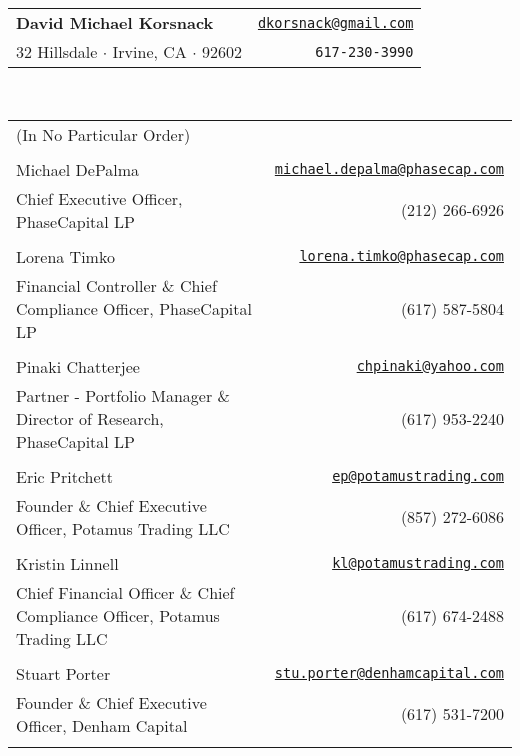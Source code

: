 \documentclass[12]{article}
\newcommand{\head}[1]{
  \colorbox{mygrey}{
    \begin{minipage}{7.35in}
      \center{\textbf{\large #1}}
    \end{minipage}
  }
}
\begin{document}
\begin{tabular*}{7.3in}{@{\extracolsep{\fill}}lr}
  \hspace{-0.25in} \textbf{\LARGE David Michael Korsnack} & \href{mailto:dkorsnack@gmail.com}{\texttt{\large dkorsnack@gmail.com}} \\
  \hspace{-0.25in} {\large 32 Hillsdale $\cdot$ Irvine, CA $\cdot$ 92602} & \texttt{\large 617-230-3990} \\
\end{tabular*} \\
\head{References}
  \begin{tabular*}{7.5in}{@{\extracolsep{\fill}}lr}
    \\
    (In No Particular Order)
    \\ \\
    Michael DePalma & \href{mailto: michael.depalma@phasecap.com}{\texttt{michael.depalma@phasecap.com}} \\
    Chief Executive Officer, PhaseCapital LP & (212) 266-6926 \\
    \\
    Lorena Timko & \href{mailto: lorena.timko@phasecap.com}{\texttt{lorena.timko@phasecap.com}} \\
    Financial Controller \& Chief Compliance Officer, PhaseCapital LP & (617) 587-5804 \\
    \\
    Pinaki Chatterjee & \href{mailto: chpinaki@yahoo.com}{\texttt{chpinaki@yahoo.com}} \\
    Partner - Portfolio Manager \& Director of Research, PhaseCapital LP & (617) 953-2240 \\
    \\
    Eric Pritchett & \href{mailto: ep@potamustrading.com}{\texttt{ep@potamustrading.com}} \\
    Founder \& Chief Executive Officer, Potamus Trading LLC & (857) 272-6086 \\
    \\
    Kristin Linnell & \href{mailto: kl@potamustrading.com}{\texttt{kl@potamustrading.com}} \\
    Chief Financial Officer \& Chief Compliance Officer, Potamus Trading LLC & (617) 674-2488  \\
    \\
    Stuart Porter & \href{mailto: stu.porter@denhamcapital.com}{\texttt{stu.porter@denhamcapital.com}} \\
    Founder \& Chief Executive Officer, Denham Capital & (617) 531-7200 \\
    \\
  \end{tabular*}
\end{document}
